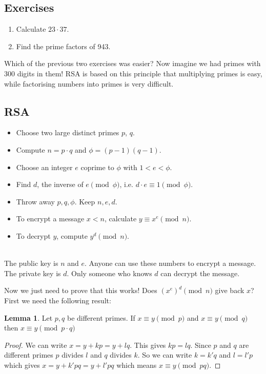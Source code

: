 \documentclass[12pt]{amsart}
\theoremstyle{definition}
\newtheorem{lemma}[theorem]{Lemma}
\theoremstyle{definition}
\theoremstyle{remark}
\begin{document}
\subsection*{Exercises}
\begin{enumerate}
\item Calculate $23 \cdot 37$.
\item Find the prime factors of 943.
\end{enumerate}

Which of the previous two exercises was easier? Now imagine we had primes with 300 digits in them! RSA is based on this principle that multiplying primes is easy, while factorising numbers into primes is very difficult.

\subsection*{RSA}
\begin{itemize}
\item Choose two large distinct primes $p$, $q$.
\item Compute $
n = p\cdot q$ and $\phi = (p-1)(q-1)$.
\item Choose an integer $e$ coprime to $\phi$ with $1<e<\phi$.
\item Find $d$, the inverse of $e \pmod \phi$, i.e. $d\cdot e \equiv 1 \pmod \phi$.
\item Throw away $p, q, \phi$. Keep $n, e, d$.
\item To encrypt a message $x < n$, calculate $y \equiv x^e \pmod n$.
\item To decrypt $y$, compute $y^d \pmod n$.
\end{itemize}
\hfill \\
The public key is $n$ and $e$. Anyone can use these numbers to encrypt a message. The private key is $d$. Only someone who knows $d$ can decrypt the message.

Now we just need to prove that this works! Does $(x^e)^d \pmod n$ give back $x$? 
First we need the following result:
\begin{lemma}
Let $p, q$ be different primes. If $x \equiv y \pmod p$ and $x \equiv y \pmod q$ then $x \equiv y \pmod {p\cdot q}$
\end{lemma}

\begin{proof}
We can write $x = y+kp=y+lq$. This gives $kp = lq$. Since $p$ and $q$ are different primes $p$ divides $l$ and $q$ divides $k$. So we can write $k = k'q$ and $l = l'p$ which gives $x = y + k'pq = y + l'pq$ which means $x \equiv y \pmod {pq}$. 
\end{proof}
\end{document}
